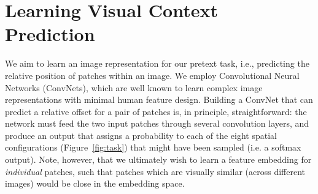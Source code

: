 \documentclass[10pt,twocolumn,letterpaper]{article}
\begin{document}
\vspace{-0.05in}
\section{Learning Visual Context Prediction}\label{sec:learning}
\vspace{-0.05in}
We aim to learn an image representation for our pretext task, i.e., predicting the relative position of patches within an image.  We employ Convolutional Neural Networks (ConvNets), which are well known to learn complex image representations with minimal human feature design.
Building a ConvNet that can predict a relative offset for a pair of patches is, in principle, straightforward: the network must feed the two input patches through several convolution layers, and produce an output that assigns a probability to each of the eight spatial configurations (Figure~\ref{fig:task}) that might have been sampled (i.e. a softmax output).  Note, however, that we ultimately wish to learn a feature embedding for {\em individual} patches, such that patches which are visually similar (across different images) would be close in the 
embedding space.  

\end{document}
